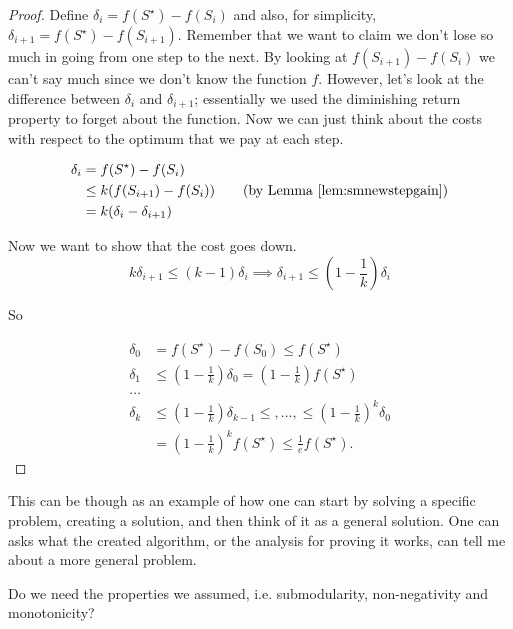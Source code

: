 \begin{proof}
Define $\delta_i = f(S^\star) - f(S_i)$ and also, for simplicity, $\delta_{i+1} = f(S^\star) - f(S_{i+1})$. 
Remember that we want to claim we don't lose so much in going from one step to the next. By looking at $f(S_{i+1}) - f(S_i)$ we can't say much since we don't know the function $f$. However, let's look at the difference between $\delta_i$ and $\delta_{i+1}$; essentially we used the diminishing return property to forget about the function. Now we can just think about the costs with respect to the optimum that we pay at each step.


\begin{align}
	\delta_i &= f(S^\star) - f(S_i)\\
	&\leq k(f(S_{i+1}) - f(S_i)) \tag{by Lemma \ref{lem:smnewstepgain}}\\
	&= k(\delta_i - \delta_{i+1})
\end{align}

Now  we want to show that the cost goes down.
\begin{equation}
k\delta_{i+1} \leq (k-1)\delta_i \implies \delta_{i+1} \leq \left(1-\frac{1}{k}\right)\delta_i
\end{equation}

So

\begin{align}
\delta_0 &= f(S^\star) - f(S_0) \leq f(S^\star) \tag{f non-negative}\\
\delta_1 &\leq \left(1 - \frac{1}{k}\right) \delta_0 = \left(1-\frac{1}{k}\right)f(S^\star)\\
\ldots\\
\delta_k &\leq \left(1-\frac{1}{k}\right)\delta_{k-1} \leq ,\ldots, \leq \left(1-\frac{1}{k}\right)^k\delta_0 \\
&=\left(1-\frac{1}{k}\right)^kf(S^\star) \leq \frac{1}{e}f(S^\star).
\end{align}
\end{proof}

This can be though as an example of how one can start by solving a specific problem, creating a solution, and then think of it as a general solution. One can asks what the created algorithm, or the analysis for proving it works, can tell me about a more general problem.

Do we need the properties we assumed, i.e. submodularity, non-negativity and monotonicity? 

